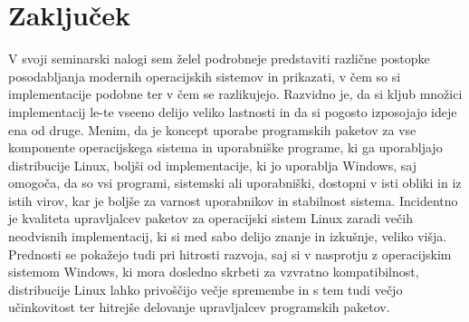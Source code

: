\section{Zaključek}

V svoji seminarski nalogi sem želel podrobneje predstaviti različne postopke posodabljanja modernih operacijskih sistemov
in prikazati, v čem so si implementacije podobne ter v čem se razlikujejo.
Razvidno je, da si kljub množici implementacij le-te vseeno delijo veliko lastnosti in da si pogosto izposojajo
ideje ena od druge.
Menim, da je koncept uporabe programskih paketov za vse komponente operacijskega sistema in uporabniške programe,
ki ga uporabljajo distribucije Linux, boljši od implementacije, ki jo uporablja Windows, saj omogoča, da so vsi
programi, sistemski ali uporabniški, dostopni v isti obliki in iz istih virov, kar je boljše za varnost uporabnikov in
stabilnost sistema.
Incidentno je kvaliteta upravljalcev paketov za operacijski sistem Linux zaradi večih neodvisnih implementacij,
ki si med sabo delijo znanje in izkušnje, veliko višja.
Prednosti se pokažejo tudi pri hitrosti razvoja, saj si v nasprotju z operacijskim sistemom Windows, ki mora dosledno
skrbeti za vzvratno kompatibilnost, distribucije Linux lahko privoščijo večje spremembe in s tem tudi večjo
učinkovitost ter hitrejše delovanje upravljalcev programskih paketov.